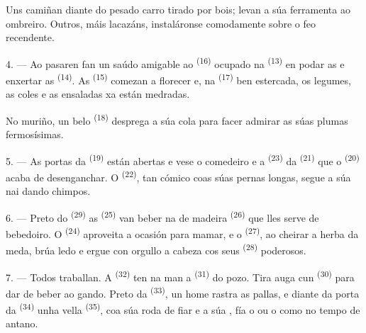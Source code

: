 Uns camiñan diante do pesado carro tirado por bois; levan a súa ferramenta ao ombreiro.
Outros, máis lacazáns, instaláronse comodamente sobre o feo recendente.

4. --- Ao pasaren fan un saúdo amigable ao  \textsuperscript{(16)} ocupado
na  \textsuperscript{(13)} en podar as  e
enxertar as  \textsuperscript{(14)}. As 
\textsuperscript{(15)} comezan a florecer e, na 
\textsuperscript{(17)} ben estercada, os legumes, as coles e as ensaladas xa están medradas.

No muriño, un belo  \textsuperscript{(18)} desprega a súa cola para facer
admirar as súas plumas fermosísimas.

\VUsaut{3.0mm}

5. --- As portas da  \textsuperscript{(19)} están abertas e vese o
comedeiro e a  \textsuperscript{(23)} da 
\textsuperscript{(21)} que o  \textsuperscript{(20)} acaba de
desenganchar. O  \textsuperscript{(22)}, tan cómico coas súas pernas longas,
segue a súa nai dando chimpos.

6. --- Preto do  \textsuperscript{(29)} as  \textsuperscript{(25)}
van beber na  de madeira \textsuperscript{(26)} que lles serve de bebedoiro. O
 \textsuperscript{(24)} aproveita a ocasión para mamar, e o 
\textsuperscript{(27)}, ao cheirar a herba da meda, brúa ledo e ergue con orgullo a cabeza cos
seus  \textsuperscript{(28)} poderosos.

7. --- Todos traballan. A  \textsuperscript{(32)} ten na man a
 \textsuperscript{(31)} do pozo. Tira auga cun 
\textsuperscript{(30)} para dar de beber ao gando. Preto da 
\textsuperscript{(33)}, un home rastra as pallas, e diante da porta da 
\textsuperscript{(34)} unha vella  \textsuperscript{(35)}, coa súa roda de
fiar e a súa , fía o  ou o  como no tempo de antano.

\VUsaut{3.0mm}
\VUsaut{3.0mm}

